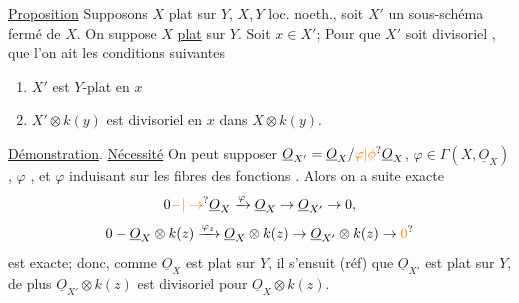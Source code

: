 \uline{Proposition} Supposons $X$ plat sur $Y$, $X,Y$ loc. noeth., soit $X'$ un sous-schéma fermé de $X$. On suppose $X$ \uline{plat} sur $Y$. Soit $x\in X'$;  Pour que $X'$ soit divisoriel  ,  que l'on ait les conditions suivantes

\begin{enumerate}[label=(\roman*)]
\item $X'$ est $Y$-plat en $x$
\item $X'\otimes k(y)$ est divisoriel  en $x$ dans $X\otimes k(y)$.
\end{enumerate}

\uline{Démonstration}. \uline{Nécessité} On peut supposer $\underline{O}_{X'}=\underline{O}_X/\unsure{\varphi|\phi}\underline{O}_X$, $\varphi\in\Gamma(X,\underline{O}_X)$, $\varphi$    \uline{}, et $\varphi$ induisant sur les fibres des fonctions . Alors on a  suite exacte
\[
0\unsure{-|\to}\underline{O}_X\xrightarrow{\varphi}\underline{O}_X\to\underline{O}_{X'}\to0,
\]
  
\[
0-\underline{O}_X\otimes k(z)\xrightarrow{\varphi_z}\underline{O}_X\otimes k(z)\to\underline{O}_{X'}\otimes k(z)\to\unsure{0}
\]
est exacte; donc, comme $\underline{O}_X$ est plat sur $Y$, il s'ensuit (réf) que $\underline{O}_{X'}$ est plat sur $Y$, de plus $\underline{O}_{X'}\otimes k(z)$ est  divisoriel pour $\underline{O}_X\otimes k(z)$. 

